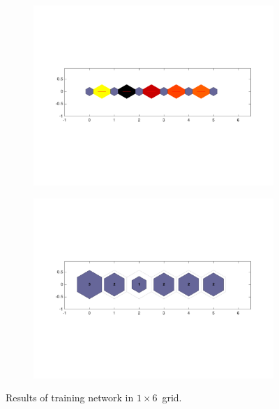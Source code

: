     \begin{figure}
        \begin{subfigure}[b]{0.5\textwidth}
            \centering
            \includegraphics[width=\textwidth]{../images/1d/apps/dist_1_by_6.png}
        \end{subfigure}
        \hfill
        \begin{subfigure}[b]{0.5\textwidth}
             \includegraphics[width=\textwidth]{../images/1d/apps/hit_t_1_by_6.png}
        \end{subfigure}
                \caption{Results of training network in $1\times6$~grid.}
         \label{fig: 1by6T}
    \end{figure}
    
